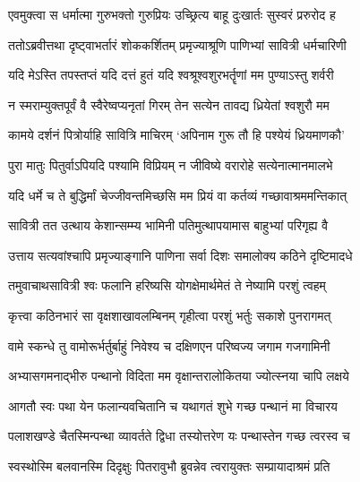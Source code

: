 


\twolineshloka
{एवमुक्त्वा स धर्मात्मा गुरुभक्तो गुरुप्रियः}
{उच्छ्रित्य बाहू दुःखार्तः सुस्वरं प्ररुरोद ह}


\twolineshloka
{ततोऽब्रवीत्तथा दृष्ट्वाभर्तारं शोककर्शितम्}
{प्रमृज्याश्रूणि पाणिभ्यां सावित्री धर्मचारिणी}


\twolineshloka
{यदि मेऽस्ति तपस्तप्तं यदि दत्तं हुतं यदि}
{श्वश्रूश्वशुरभर्तॄणां मम पुण्याऽस्तु शर्वरी}


\twolineshloka
{न स्मराम्युक्तपूर्वं वै स्वैरेष्वप्यनृतां गिरम्}
{तेन सत्येन तावद्य ध्रियेतां श्वशुरौ मम}




\twolineshloka
{कामये दर्शनं पित्रोर्याहि सावित्रि माचिरम्}
{`अपिनाम गुरू तौ हि पश्येयं ध्रियमाणकौ'}


\twolineshloka
{पुरा मातुः पितुर्वाऽपियदि पश्यामि विप्रियम्}
{न जीविष्ये वरारोहे सत्येनात्मानमालभे}


\twolineshloka
{यदि धर्मे च ते बुद्धिर्मां चेज्जीवन्तमिच्छसि}
{मम प्रियं वा कर्तव्यं गच्छावाश्रममन्तिकात्}




\twolineshloka
{सावित्री तत उत्थाय केशान्सम्म्य भामिनी}
{पतिमुत्थापयामास बाहुभ्यां परिगृह्य वै}


\twolineshloka
{उत्ताय सत्यवांश्चापि प्रमृज्याङ्गानि पाणिना}
{सर्वा दिशः समालोक्य कठिने दृष्टिमादधे}


\twolineshloka
{तमुवाचाथसावित्री श्वः फलानि हरिष्यसि}
{योगक्षेमार्थमेतं ते नेष्यामि परशुं त्वहम्}


\twolineshloka
{कृत्त्वा कठिनभारं सा वृक्षशाखावलम्बिनम्}
{गृहीत्वा परशुं भर्तुः सकाशे पुनरागमत्}


\twolineshloka
{वामे स्कन्धे तु वामोरूर्भर्तुर्बाहुं निवेश्य च}
{दक्षिणएन परिष्वज्य जगाम गजगामिनी}




\twolineshloka
{अभ्यासगमनाद्भीरु पन्थानो विदिता मम}
{वृक्षान्तरालोकितया ज्योत्स्नया चापि लक्षये}


\twolineshloka
{आगतौ स्वः पथा येन फलान्यवचितानि च}
{यथागतं शुभे गच्छ पन्थानं मा विचारय}


\twolineshloka
{पलाशखण्डे चैतस्मिन्पन्था व्यावर्तते द्विधा}
{तस्योत्तरेण यः पन्थास्तेन गच्छ त्वरस्व च}


\twolineshloka
{स्वस्थोस्मि बलवानस्मि दिदृक्षुः पितरावुभौ}
{ब्रुवन्नेव त्वरायुक्तः सम्प्रायादाश्रमं प्रति}


